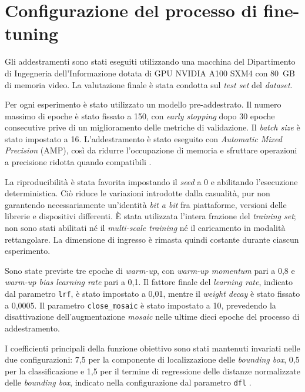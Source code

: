 \section{Configurazione del processo di fine-tuning}

Gli addestramenti sono stati eseguiti utilizzando una macchina del Dipartimento di Ingegneria dell'Informazione dotata di GPU NVIDIA A100 SXM4 con 80~GB di memoria video. La valutazione finale è stata condotta sul \textit{test set} del \textit{dataset}.

Per ogni esperimento è stato utilizzato un modello pre-addestrato. Il numero massimo di epoche è stato fissato a 150, con \textit{early stopping} dopo 30 epoche consecutive prive di un miglioramento delle metriche di validazione. Il \textit{batch size} è stato impostato a 16. L'addestramento è stato eseguito con \textit{Automatic Mixed Precision} (AMP), così da ridurre l'occupazione di memoria e sfruttare operazioni a precisione ridotta quando compatibili \cite{Micikevicius2018MixedPrecision}.

La riproducibilità è stata favorita impostando il \textit{seed} a 0 e abilitando l'esecuzione deterministica. Ciò riduce le variazioni introdotte dalla casualità, pur non garantendo necessariamente un'identità \textit{bit a bit} fra piattaforme, versioni delle librerie e dispositivi differenti. È stata utilizzata l'intera frazione del \textit{training set}; non sono stati abilitati né il \textit{multi-scale training} né il caricamento in modalità rettangolare. La dimensione di ingresso è rimasta quindi costante durante ciascun esperimento.

Sono state previste tre epoche di \textit{warm-up}, con \textit{warm-up momentum} pari a 0{,}8 e \textit{warm-up bias learning rate} pari a 0{,}1. Il fattore finale del \textit{learning rate}, indicato dal parametro \texttt{lrf}, è stato impostato a 0{,}01, mentre il \textit{weight decay} è stato fissato a 0{,}0005. Il parametro \texttt{close\_mosaic} è stato impostato a 10, prevedendo la disattivazione dell'augmentazione \textit{mosaic} nelle ultime dieci epoche del processo di addestramento.

I coefficienti principali della funzione obiettivo sono stati mantenuti invariati nelle due configurazioni: 7{,}5 per la componente di localizzazione delle \textit{bounding box}, 0{,}5 per la classificazione e 1{,}5 per il termine di regressione delle distanze normalizzate delle \textit{bounding box}, indicato nella configurazione dal parametro \texttt{dfl} \cite{Jocher2026YOLO26}.

